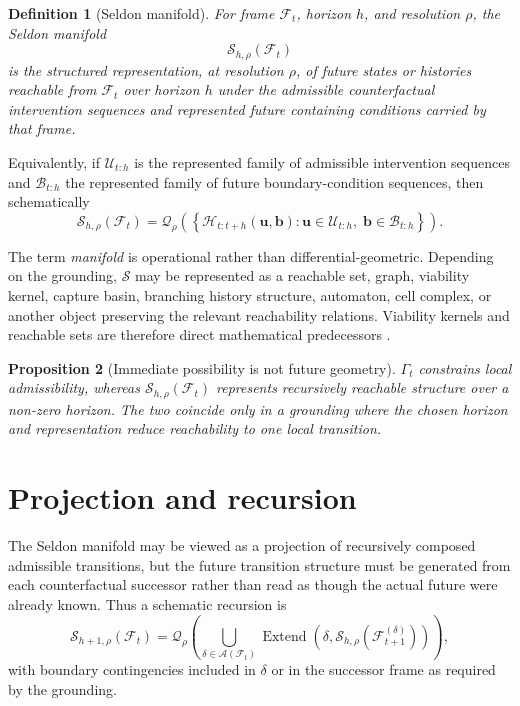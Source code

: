 \documentclass[11pt,a4paper]{article}
\newtheorem{definition}{Definition}[section]
\newtheorem{proposition}[definition]{Proposition}
\theoremstyle{remark}
\newcommand{\Frame}{\mathcal F}
\newcommand{\Seldon}{\mathcal S}
\newcommand{\Aset}{\mathcal A}
\newcommand{\Hist}{\mathcal H}
\newcommand{\Qrho}{\mathcal Q_{\rho}}
\begin{document}
\begin{definition}[Seldon manifold]\label{def:seldon}
For frame $\Frame_t$, horizon $h$, and resolution $\rho$, the Seldon manifold
\[
\boxed{\Seldon_{h,\rho}(\Frame_t)}
\]
is the structured representation, at resolution $\rho$, of future states or histories reachable from $\Frame_t$ over horizon $h$ under the admissible counterfactual intervention sequences and represented future containing conditions carried by that frame.
\end{definition}

Equivalently, if $\mathcal U_{t:h}$ is the represented family of admissible intervention sequences and $\mathcal B_{t:h}$ the represented family of future boundary-condition sequences, then schematically
\[
\boxed{
\Seldon_{h,\rho}(\Frame_t)
=
\Qrho\!\left(
\left\{
\Hist_{t:t+h}(\mathbf u,\mathbf b):
\mathbf u\in\mathcal U_{t:h},\;
\mathbf b\in\mathcal B_{t:h}
\right\}
\right).
}
\]

The term \emph{manifold} is operational rather than differential-geometric. Depending on the grounding, $\Seldon$ may be represented as a reachable set, graph, viability kernel, capture basin, branching history structure, automaton, cell complex, or another object preserving the relevant reachability relations. Viability kernels and reachable sets are therefore direct mathematical predecessors \citep{aubin1990,aubin1991,szolnoki2000,mitchell2005}.

\begin{proposition}[Immediate possibility is not future geometry]\label{prop:local-vs-manifold}
$\Gamma_t$ constrains local admissibility, whereas $\Seldon_{h,\rho}(\Frame_t)$ represents recursively reachable structure over a non-zero horizon. The two coincide only in a grounding where the chosen horizon and representation reduce reachability to one local transition.
\end{proposition}

\section{Projection and recursion}\label{sec:projection}

The Seldon manifold may be viewed as a projection of recursively composed admissible transitions, but the future transition structure must be generated from each counterfactual successor rather than read as though the actual future were already known. Thus a schematic recursion is
\[
\Seldon_{h+1,\rho}(\Frame_t)
=
\Qrho\!\left(
\bigcup_{\delta\in\Aset(\Frame_t)}
\operatorname{Extend}
\left(
\delta,
\Seldon_{h,\rho}(\Frame_{t+1}^{(\delta)})
\right)
\right),
\]
with boundary contingencies included in $\delta$ or in the successor frame as required by the grounding.
\end{document}
